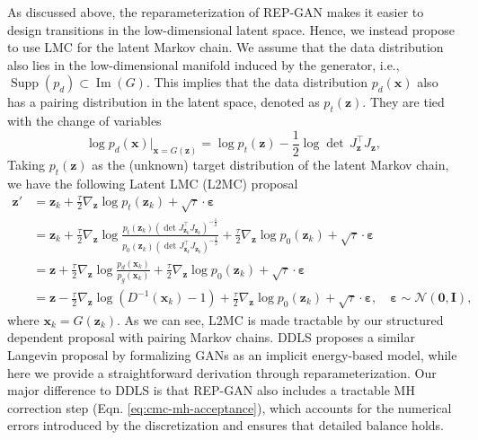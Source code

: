 \documentclass{article} %
\newcommand{\bx}{\mathbf{x}}
\newcommand{\bz}{\mathbf{z}}
\newcommand{\bI}{\mathbf{I}}
\newcommand{\bvarepsilon}{\bm{\varepsilon}}
\newcommand{\cN}{\mathcal{N}}
\newcommand{\bzero}{\mathbf{0}}
\newcommand{\<}{\left\langle}
\renewcommand{\>}{\right\rangle}
\begin{document}
As discussed above, the reparameterization of REP-GAN makes it easier to design transitions in the low-dimensional latent space. Hence, we instead propose to use LMC for the latent Markov chain.
We assume that the data distribution also lies in the low-dimensional manifold induced by the generator, i.e., 
$\operatorname{Supp}\left(p_d\right)\subset\operatorname{Im}(G)$. This implies that the data distribution $p_d(\bx)$ also has a pairing distribution in the latent space, denoted as $p_t(\bz)$. They are tied with the change of variables
\begin{equation}
\log p_d(\bx)\rvert_{\bx=G(\bz)}=\log p_t(\bz) - \frac{1}{2} \log\det\, J_{\bz}^\top J_{\bz},
\end{equation}
Taking $p_t(\bz)$ as the (unknown) target distribution of the latent Markov chain, we have the following Latent LMC (L2MC) proposal 
\begin{equation}
\begin{aligned}
\bz'&=\bz_k+\frac{\tau}{2}\nabla_{\bz}\log p_t(\bz_k)+\sqrt{\tau}\cdot\bvarepsilon\\
&=\bz_k+\frac{\tau}{2}\nabla_{\bz}\log\frac{p_t(\bz_k)
\left(\det J_{\bz_k}^\top J_{\bz_k}\right)^{-\frac{1}{2}}
}{p_0(\bz_k)
\left(\det J_{\bz_k}^\top J_{\bz_k}\right)^{-\frac{1}{2}}
}+\frac{\tau}{2}\nabla_{\bz}\log p_0(\bz_k)+\sqrt{\tau}\cdot\bvarepsilon\\
&=\bz+\frac{\tau}{2}\nabla_{\bz}\log\frac{p_d(\bx_k)}{p_g(\bx_k)}+\frac{\tau}{2}\nabla_{\bz}\log p_0(\bz_k)+\sqrt{\tau}\cdot\bvarepsilon\\
&=\bz-\frac{\tau}{2}\nabla_{\bz}\log(D^{-1}(\bx_k)-1)+\frac{\tau}{2}\nabla_{\bz}\log p_0(\bz_k)+\sqrt{\tau}\cdot\bvarepsilon, \quad\bvarepsilon\sim\cN(\bzero,\bI),
\end{aligned}
\label{eq:langevin}
\end{equation}
where $\bx_k=G(\bz_k)$. As we can see, L2MC is made tractable by our structured dependent proposal with pairing Markov chains. DDLS \citep{che2020your} proposes a similar Langevin proposal by formalizing GANs as an implicit energy-based model, while here we provide a straightforward derivation through reparameterization. Our major difference to DDLS is that REP-GAN also includes a tractable MH correction step (Eqn. \eqref{eq:cmc-mh-acceptance}), which accounts for the numerical errors introduced by the  discretization and ensures that detailed balance holds. 
\end{document}
